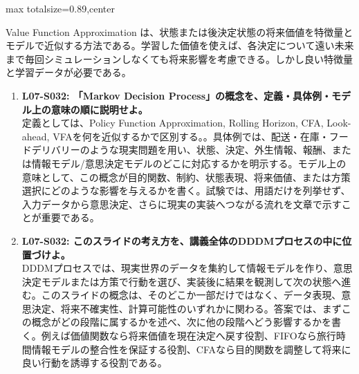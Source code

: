 \begin{minipage}[t]{0.58\textwidth}
\begin{adjustbox}{max totalsize={\textwidth}{0.89\textheight},center}
\begin{minipage}{\textwidth}
Value Function Approximation は、状態または後決定状態の将来価値を特徴量とモデルで近似する方法である。学習した価値を使えば、各決定について遠い未来まで毎回シミュレーションしなくても将来影響を考慮できる。しかし良い特徴量と学習データが必要である。\par{}\begin{enumerate}\item \textbf{L07-S032: 「Markov Decision Process」の概念を、定義・具体例・モデル上の意味の順に説明せよ。}\\定義としては、Policy Function Approximation, Rolling Horizon, CFA, Look-ahead, VFAを何を近似するかで区別する。。具体例では、配送・在庫・フードデリバリーのような現実問題を用い、状態、決定、外生情報、報酬、または情報モデル/意思決定モデルのどこに対応するかを明示する。モデル上の意味として、この概念が目的関数、制約、状態表現、将来価値、または方策選択にどのような影響を与えるかを書く。試験では、用語だけを列挙せず、入力データから意思決定、さらに現実の実装へつながる流れを文章で示すことが重要である。\item \textbf{L07-S032: このスライドの考え方を、講義全体のDDDMプロセスの中に位置づけよ。}\\DDDMプロセスでは、現実世界のデータを集約して情報モデルを作り、意思決定モデルまたは方策で行動を選び、実装後に結果を観測して次の状態へ進む。このスライドの概念は、そのどこか一部だけではなく、データ表現、意思決定、将来不確実性、計算可能性のいずれかに関わる。答案では、まずこの概念がどの段階に属するかを述べ、次に他の段階へどう影響するかを書く。例えば価値関数なら将来価値を現在決定へ戻す役割、FIFOなら旅行時間情報モデルの整合性を保証する役割、CFAなら目的関数を調整して将来に良い行動を誘導する役割である。\end{enumerate}
\end{minipage}
\end{adjustbox}
\end{minipage}


